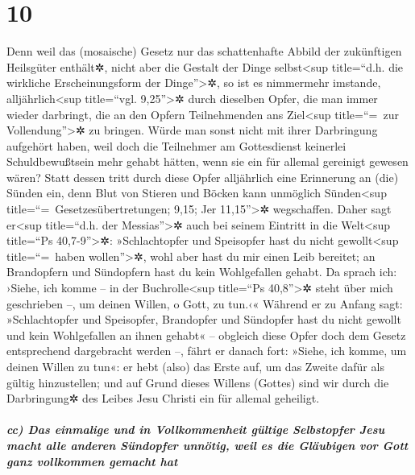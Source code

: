 \hypertarget{section-9}{%
\section{10}\label{section-9}}

 Denn weil das (mosaische) Gesetz nur das schattenhafte
Abbild der zukünftigen Heilsgüter enthält✲, nicht aber die Gestalt der
Dinge selbst\textless sup title=``d.h. die wirkliche Erscheinungsform
der Dinge''\textgreater✲, so ist es nimmermehr imstande,
alljährlich\textless sup title=``vgl. 9,25''\textgreater✲ durch
dieselben Opfer, die man immer wieder darbringt, die an den Opfern
Teilnehmenden ans Ziel\textless sup title=``=~zur
Vollendung''\textgreater✲ zu bringen.  Würde man sonst
nicht mit ihrer Darbringung aufgehört haben, weil doch die Teilnehmer am
Gottesdienst keinerlei Schuldbewußtsein mehr gehabt hätten, wenn sie ein
für allemal gereinigt gewesen wären?  Statt dessen tritt
durch diese Opfer alljährlich eine Erinnerung an (die) Sünden ein,
 denn Blut von Stieren und Böcken kann unmöglich
Sünden\textless sup title=``=~Gesetzesübertretungen; 9,15; Jer
11,15''\textgreater✲ wegschaffen.  Daher sagt
er\textless sup title=``d.h. der Messias''\textgreater✲ auch bei seinem
Eintritt in die Welt\textless sup title=``Ps 40,7-9''\textgreater✲:
»Schlachtopfer und Speisopfer hast du nicht gewollt\textless sup
title=``=~haben wollen''\textgreater✲, wohl aber hast du mir einen Leib
bereitet;  an Brandopfern und Sündopfern hast du kein
Wohlgefallen gehabt.  Da sprach ich: ›Siehe, ich komme --
in der Buchrolle\textless sup title=``Ps 40,8''\textgreater✲ steht über
mich geschrieben --, um deinen Willen, o Gott, zu tun.‹« 
Während er zu Anfang sagt: »Schlachtopfer und Speisopfer, Brandopfer und
Sündopfer hast du nicht gewollt und kein Wohlgefallen an ihnen gehabt«
-- obgleich diese Opfer doch dem Gesetz entsprechend dargebracht werden
--,  fährt er danach fort: »Siehe, ich komme, um deinen
Willen zu tun«: er hebt (also) das Erste auf, um das Zweite dafür als
gültig hinzustellen;  und auf Grund dieses Willens
(Gottes) sind wir durch die Darbringung✲ des Leibes Jesu Christi ein für
allemal geheiligt.

\hypertarget{cc-das-einmalige-und-in-vollkommenheit-guxfcltige-selbstopfer-jesu-macht-alle-anderen-suxfcndopfer-unnuxf6tig-weil-es-die-gluxe4ubigen-vor-gott-ganz-vollkommen-gemacht-hat}{%
\subparagraph{cc) Das einmalige und in Vollkommenheit gültige
Selbstopfer Jesu macht alle anderen Sündopfer unnötig, weil es die
Gläubigen vor Gott ganz vollkommen gemacht
hat}\label{cc-das-einmalige-und-in-vollkommenheit-guxfcltige-selbstopfer-jesu-macht-alle-anderen-suxfcndopfer-unnuxf6tig-weil-es-die-gluxe4ubigen-vor-gott-ganz-vollkommen-gemacht-hat}}

